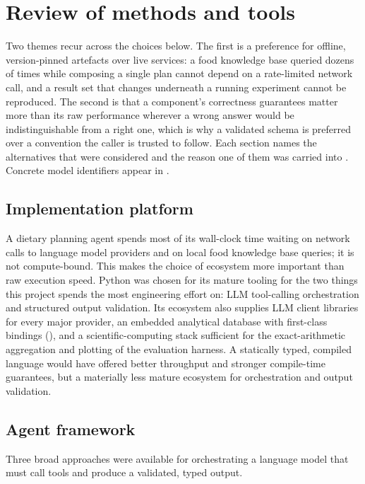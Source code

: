 \chapter{Review of methods and tools}
\label{cha:methods-and-tools}

Two themes recur across the choices below. The first is a preference for offline, version-pinned artefacts over live services: a food knowledge base queried dozens of times while composing a single plan cannot depend on a rate-limited network call, and a result set that changes underneath a running experiment cannot be reproduced. The second is that a component's correctness guarantees matter more than its raw performance wherever a wrong answer would be indistinguishable from a right one, which is why a validated schema is preferred over a convention the caller is trusted to follow. Each section names the alternatives that were considered and the reason one of them was carried into . Concrete model identifiers appear in .

\section{Implementation platform}
\label{sec:tools-platform}

A dietary planning agent spends most of its wall-clock time waiting on network calls to language model providers and on local food knowledge base queries; it is not compute-bound. This makes the choice of ecosystem more important than raw execution speed. Python was chosen for its mature tooling for the two things this project spends the most engineering effort on: LLM tool-calling orchestration and structured output validation. Its ecosystem also supplies LLM client libraries for every major provider, an embedded analytical database with first-class bindings (), and a scientific-computing stack sufficient for the exact-arithmetic aggregation and plotting of the evaluation harness. A statically typed, compiled language would have offered better throughput and stronger compile-time guarantees, but a materially less mature ecosystem for orchestration and output validation.

\section{Agent framework}
\label{sec:tools-agent-framework}

Three broad approaches were available for orchestrating a language model that must call tools and produce a validated, typed output.

